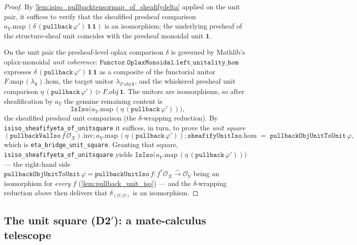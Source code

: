 \begin{proof}
  \leanok
  By \cref{lem:isiso_pullbacktensormap_of_sheafifydelta} applied on the unit pair,
  it suffices to verify that the sheafified presheaf comparison
  \(a_Y.\mathrm{map}\,(\delta\,(\mathtt{pullback}\,\varphi')\,\mathbf{1}\,\mathbf{1})\)
  is an isomorphism; the underlying presheaf of the structure-sheaf unit coincides with
  the presheaf monoidal unit \(\mathbf{1}\).

  On the unit pair the presheaf-level oplax comparison \(\delta\) is governed by Mathlib's
  oplax-monoidal \emph{unit coherence}: \(\mathtt{Functor.OplaxMonoidal.left\_unitality\_hom}\)
  expresses \(\delta\,(\mathtt{pullback}\,\varphi')\,\mathbf{1}\,\mathbf{1}\) as a composite of
  the functorial unitor \(F.\mathrm{map}\,(\lambda_{\mathbf{1}}).\mathrm{hom}\), the target
  unitor \(\lambda_{F.\mathrm{obj}\,\mathbf{1}}\), and the whiskered presheaf unit comparison
  \(\eta\,(\mathtt{pullback}\,\varphi') \rhd F.\mathrm{obj}\,\mathbf{1}\). The unitors are
  isomorphisms, so after sheafification by \(a_Y\) the genuine remaining content is
  \[
    \mathtt{IsIso}\bigl(a_Y.\mathrm{map}\,(\eta\,(\mathtt{pullback}\,\varphi'))\bigr),
  \]
  the sheafified presheaf unit comparison (the \(\delta\)-wrapping reduction). By \texttt{isiso\_sheafifyeta\_of\_unitsquare} it suffices, in turn, to prove the
  \emph{unit square}
  \[
    (\mathtt{pullbackValIso}\,f\,\mathcal{O}_X).\mathrm{inv} \mathbin{;}
      a_Y.\mathrm{map}\,(\eta\,(\mathtt{pullback}\,\varphi')) \mathbin{;}
      \mathtt{sheafifyUnitIso}.\mathrm{hom}
      \;=\; \mathtt{pullbackObjUnitToUnit}\,\varphi,
  \]
  which is \texttt{eta\_bridge\_unit\_square}. Granting that square,
  \texttt{isiso\_sheafifyeta\_of\_unitsquare} yields
  \(\mathtt{IsIso}\bigl(a_Y.\mathrm{map}\,(\eta\,(\mathtt{pullback}\,\varphi'))\bigr)\) --- the
  right-hand side \(\mathtt{pullbackObjUnitToUnit}\,\varphi = \mathtt{pullbackUnitIso}\,f :
  f^*\mathcal{O}_X \xrightarrow{\sim} \mathcal{O}_Y\) being an isomorphism for \emph{every}
  \(f\) (\cref{lem:pullback_unit_iso}) --- and the \(\delta\)-wrapping reduction above then
  delivers that \(\delta_{(\mathcal{O},\mathcal{O})}\) is an isomorphism.
\end{proof}

\subsection{The unit square (D2$'$): a mate-calculus telescope}

